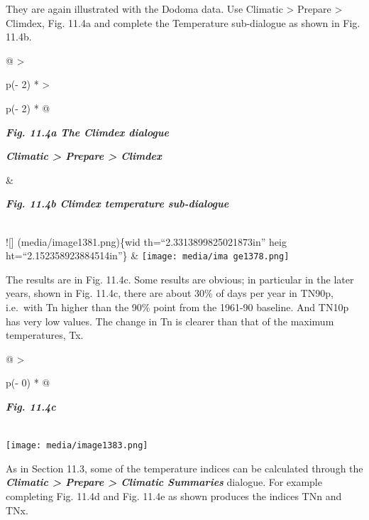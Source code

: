 \documentclass[
  letterpaper,
  DIV=11,
  numbers=noendperiod]{scrreprt}
\begin{document}
They are again illustrated with the Dodoma data. Use Climatic
\textgreater{} Prepare \textgreater{} Climdex, Fig. 11.4a and complete
the Temperature sub-dialogue as shown in Fig. 11.4b.

\begin{longtable}[]{@{}
  >{\raggedright\arraybackslash}p{(\columnwidth - 2\tabcolsep) * }
  >{\raggedright\arraybackslash}p{(\columnwidth - 2\tabcolsep) * }@{}}
\toprule\noalign{}
\begin{minipage}[b]{\linewidth}\raggedright
\textbf{\emph{Fig. 11.4a The Climdex dialogue}}

\textbf{\emph{Climatic \textgreater{} Prepare \textgreater{} Climdex}}
\end{minipage} & \begin{minipage}[b]{\linewidth}\raggedright
\textbf{\emph{Fig. 11.4b Climdex temperature sub-dialogue}}
\end{minipage} \\
\midrule\noalign{}
\endhead
\bottomrule\noalign{}
\endlastfoot
!{[}{]} (media/image1381.png)\{wid th=``2.3313899825021873in'' heig
ht=``2.152358923884514in''\} &
\texttt{[image: media/ima ge1378.png]} \\
\end{longtable}

The results are in Fig. 11.4c. Some results are obvious; in particular
in the later years, shown in Fig. 11.4c, there are about 30\% of days
per year in TN90p, i.e.~with Tn higher than the 90\% point from the
1961-90 baseline. And TN10p has very low values. The change in Tn is
clearer than that of the maximum temperatures, Tx.

\begin{longtable}[]{@{}
  >{\raggedright\arraybackslash}p{(\columnwidth - 0\tabcolsep) * }@{}}
\toprule\noalign{}
\begin{minipage}[b]{\linewidth}\raggedright
\textbf{\emph{Fig. 11.4c}}
\end{minipage} \\
\midrule\noalign{}
\endhead
\bottomrule\noalign{}
\endlastfoot
\texttt{[image: media/image1383.png]} \\
\end{longtable}

As in Section 11.3, some of the temperature indices can be calculated
through the \textbf{\emph{Climatic \textgreater{} Prepare \textgreater{}
Climatic Summaries}} dialogue. For example completing Fig. 11.4d and
Fig. 11.4e as shown produces the indices TNn and TNx.
\end{document}
